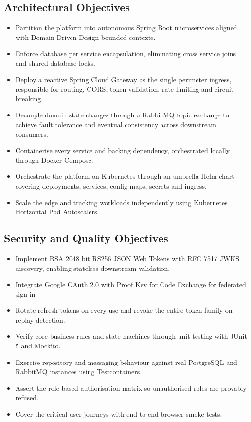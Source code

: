 \documentclass[11pt,a4paper,oneside,openany]{report}
\begin{document}
\subsection{Architectural Objectives}
\begin{itemize}[leftmargin=*]
\item Partition the platform into autonomous Spring Boot microservices aligned with
Domain Driven Design bounded contexts.
\item Enforce database per service encapsulation, eliminating cross service joins and shared
database locks.
\item Deploy a reactive Spring Cloud Gateway as the single perimeter ingress, responsible for
routing, CORS, token validation, rate limiting and circuit breaking.
\item Decouple domain state changes through a RabbitMQ topic exchange to achieve fault tolerance
and eventual consistency across downstream consumers.
\item Containerise every service and backing dependency, orchestrated locally through Docker
Compose.
\item Orchestrate the platform on Kubernetes through an umbrella Helm chart covering deployments,
services, config maps, secrets and ingress.
\item Scale the edge and tracking workloads independently using Kubernetes Horizontal Pod
Autoscalers.
\end{itemize}

\subsection{Security and Quality Objectives}
\begin{itemize}[leftmargin=*]
\item Implement RSA 2048 bit RS256 JSON Web Tokens with RFC 7517 JWKS discovery, enabling stateless
downstream validation.
\item Integrate Google OAuth 2.0 with Proof Key for Code Exchange for federated sign in.
\item Rotate refresh tokens on every use and revoke the entire token family on replay detection.
\item Verify core business rules and state machines through unit testing with JUnit 5 and Mockito.
\item Exercise repository and messaging behaviour against real PostgreSQL and RabbitMQ instances
using Testcontainers.
\item Assert the role based authorisation matrix so unauthorised roles are provably refused.
\item Cover the critical user journeys with end to end browser smoke tests.
\end{itemize}
\end{document}
